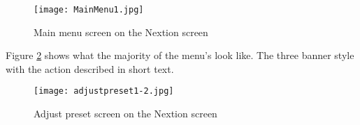 \begin{figure}[ht]
    \texttt{[image: MainMenu1.jpg]}
    \caption{Main menu screen on the Nextion screen}
    \label{fig:Main-menu}
\end{figure}

Figure \ref{fig:adjust-preset} shows what the majority of the menu's look like. The three banner style with the action described in short text.

\begin{figure}[ht]
    \texttt{[image: adjustpreset1-2.jpg]}
    \caption{Adjust preset screen on the Nextion screen}
    \label{fig:adjust-preset}
\end{figure}